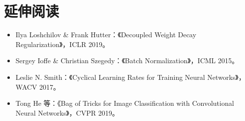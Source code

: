 \documentclass[UTF8,zihao=-4]{ctexart}
\begin{document}
\section*{延伸阅读}
\begin{itemize}
  \item Ilya Loshchilov \& Frank Hutter：《Decoupled Weight Decay Regularization》，ICLR 2019。
  \item Sergey Ioffe \& Christian Szegedy：《Batch Normalization》，ICML 2015。
  \item Leslie N. Smith：《Cyclical Learning Rates for Training Neural Networks》，WACV 2017。
  \item Tong He 等：《Bag of Tricks for Image Classification with Convolutional Neural Networks》，CVPR 2019。
\end{itemize}
\end{document}
